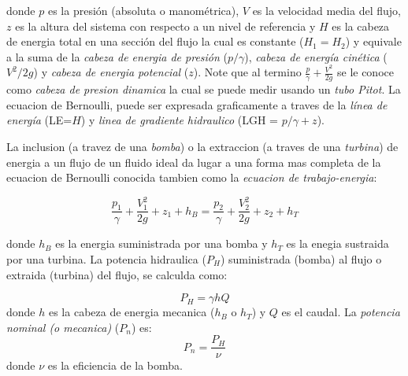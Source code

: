 \documentclass[10pt, oneside]{article}
\begin{document}
donde $p$ es la presi\'on (absoluta o manom\'etrica), $V$ es la velocidad media del flujo, $z$ es la altura del sistema con respecto a un nivel de referencia y $H$ es la cabeza de energia total en una secci\'on del flujo la cual es constante ($H_1 = H_2 $) y equivale a la suma de la \emph{cabeza de energia de presi\'on} ($p/\gamma$), \emph{cabeza de energ\'ia cin\'etica} ($V^2 /2g$) y \emph{cabeza de energia potencial} ($z$). Note que al termino $\frac{p}{\gamma} + \frac{V^2}{2g}$ se le conoce como \emph{cabeza de presion dinamica} la cual se puede medir usando un \emph{tubo Pitot}. La ecuacion de Bernoulli, puede ser expresada graficamente a traves de la \emph{l\'inea de energ\'ia} (LE=$H$) y \emph{linea de gradiente hidraulico} (LGH = $p/\gamma + z$).

La inclusion (a travez de una \emph{bomba}) o la extraccion (a traves de una \emph{turbina}) de energia a un flujo de un fluido ideal da lugar a una forma mas completa de la ecuacion de Bernoulli conocida tambien como la \emph{ecuacion de trabajo-energia}:

\begin{equation}
\frac{p_1}{\gamma} + \frac{V_1^2}{2g} + z_1 + h_B =\frac{p_2}{\gamma} + \frac{V_2^2}{2g} + z_2 + h_T
\end{equation}

donde $h_B$ es la energia suministrada por una bomba y $h_T$ es la enegia sustraida por una turbina. La potencia hidraulica ($P_H$) suministrada (bomba) al flujo o extraida (turbina) del flujo, se calculda como:

\begin{equation}
P_H = \gamma h Q
\end{equation}
donde $h$ es la cabeza de energia mecanica ($h_B$ o $h_T$) y $Q$ es el caudal. La \emph{potencia nominal (o mecanica)} ($P_n$) es:
\begin{equation}
P_n = \frac{P_H}{\nu}
\end{equation}
donde $\nu$ es la eficiencia de la bomba.

 
\end{document}
